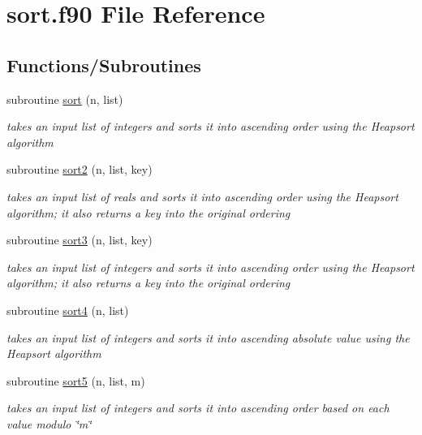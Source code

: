 \hypertarget{sort_8f90}{\section{sort.\-f90 File Reference}
\label{sort_8f90}
}
\subsection*{Functions/\-Subroutines}
\begin{DoxyCompactItemize}
\item 
subroutine \hyperlink{sort_8f90_ac872b907d2d2229369115872f5c65c17}{sort} (n, list)
\begin{DoxyCompactList}\small\item\em takes an input list of integers and sorts it into ascending order using the Heapsort algorithm \end{DoxyCompactList}\item 
subroutine \hyperlink{sort_8f90_a3ca4528b5255d3b3d99ec6721d77ec5d}{sort2} (n, list, key)
\begin{DoxyCompactList}\small\item\em takes an input list of reals and sorts it into ascending order using the Heapsort algorithm; it also returns a key into the original ordering \end{DoxyCompactList}\item 
subroutine \hyperlink{sort_8f90_a4b2d0e93ed9d5e3481d5123a3a0af0cf}{sort3} (n, list, key)
\begin{DoxyCompactList}\small\item\em takes an input list of integers and sorts it into ascending order using the Heapsort algorithm; it also returns a key into the original ordering \end{DoxyCompactList}\item 
subroutine \hyperlink{sort_8f90_ac8f2b651f06c72ef68145ef0c3b91d20}{sort4} (n, list)
\begin{DoxyCompactList}\small\item\em takes an input list of integers and sorts it into ascending absolute value using the Heapsort algorithm \end{DoxyCompactList}\item 
subroutine \hyperlink{sort_8f90_aec31183a09aca5cf127a21a753b44c14}{sort5} (n, list, m)
\begin{DoxyCompactList}\small\item\em takes an input list of integers and sorts it into ascending order based on each value modulo \char`\"{}m\char`\"{} \end{DoxyCompactList}\item 

\end{DoxyCompactItemize}

